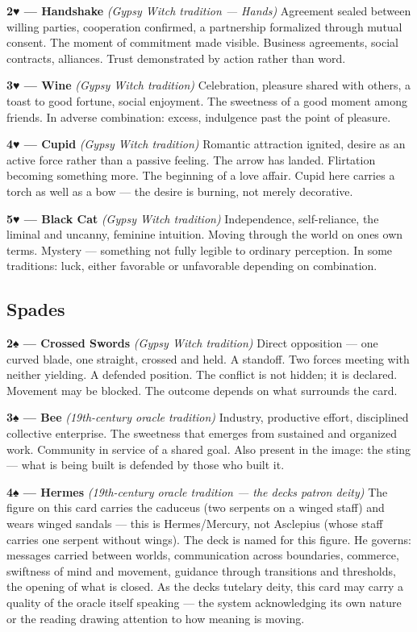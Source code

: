 \textbf{2♥ --- Handshake} \emph{(Gypsy Witch tradition --- Hands)} Agreement sealed between willing parties, cooperation confirmed, a partnership formalized through mutual consent. The moment of commitment made visible. Business agreements, social contracts, alliances. Trust demonstrated by action rather than word.

\textbf{3♥ --- Wine} \emph{(Gypsy Witch tradition)} Celebration, pleasure shared with others, a toast to good fortune, social enjoyment. The sweetness of a good moment among friends. In adverse combination: excess, indulgence past the point of pleasure.

\textbf{4♥ --- Cupid} \emph{(Gypsy Witch tradition)} Romantic attraction ignited, desire as an active force rather than a passive feeling. The arrow has landed. Flirtation becoming something more. The beginning of a love affair. Cupid here carries a torch as well as a bow --- the desire is burning, not merely decorative.

\textbf{5♥ --- Black Cat} \emph{(Gypsy Witch tradition)} Independence, self-reliance, the liminal and uncanny, feminine intuition. Moving through the world on one\textquotesingle s own terms. Mystery --- something not fully legible to ordinary perception. In some traditions: luck, either favorable or unfavorable depending on combination.

\subsection{Spades}\label{spades}

\textbf{2♠ --- Crossed Swords} \emph{(Gypsy Witch tradition)} Direct opposition --- one curved blade, one straight, crossed and held. A standoff. Two forces meeting with neither yielding. A defended position. The conflict is not hidden; it is declared. Movement may be blocked. The outcome depends on what surrounds the card.

\textbf{3♠ --- Bee} \emph{(19th-century oracle tradition)} Industry, productive effort, disciplined collective enterprise. The sweetness that emerges from sustained and organized work. Community in service of a shared goal. Also present in the image: the sting --- what is being built is defended by those who built it.

\textbf{4♠ --- Hermes} \emph{(19th-century oracle tradition --- the deck\textquotesingle s patron deity)} The figure on this card carries the caduceus (two serpents on a winged staff) and wears winged sandals --- this is Hermes/Mercury, not Asclepius (whose staff carries one serpent without wings). The deck is named for this figure. He governs: messages carried between worlds, communication across boundaries, commerce, swiftness of mind and movement, guidance through transitions and thresholds, the opening of what is closed. As the deck\textquotesingle s tutelary deity, this card may carry a quality of the oracle itself speaking --- the system acknowledging its own nature or the reading drawing attention to how meaning is moving.

